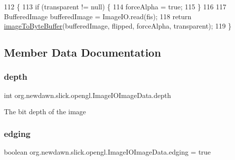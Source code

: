 \begin{DoxyCode}
112                                                                                                            
                       \{
113         \textcolor{keywordflow}{if} (transparent != null) \{
114             forceAlpha = \textcolor{keyword}{true};
115         \}
116         
117         BufferedImage bufferedImage = ImageIO.read(fis);
118         \textcolor{keywordflow}{return} \mbox{\hyperlink{classorg_1_1newdawn_1_1slick_1_1opengl_1_1_image_i_o_image_data_ac5ab7c2b917c07b09fa100784fc7b8d7}{imageToByteBuffer}}(bufferedImage, flipped, forceAlpha, transparent);
119     \}
\end{DoxyCode}


\subsection{Member Data Documentation}
\mbox{\label{classorg_1_1newdawn_1_1slick_1_1opengl_1_1_image_i_o_image_data_a9732e4c418ef7044cb5ee44f1a6e5f69}} 
\subsubsection{\texorpdfstring{depth}{depth}}
{\footnotesize\ttfamily int org.\+newdawn.\+slick.\+opengl.\+Image\+I\+O\+Image\+Data.\+depth\hspace{0.3cm}{\ttfamily [private]}}

The bit depth of the image \mbox{\label{classorg_1_1newdawn_1_1slick_1_1opengl_1_1_image_i_o_image_data_ae93f5c7af2aa1995c55cd584bf5e9735}} 
\subsubsection{\texorpdfstring{edging}{edging}}
{\footnotesize\ttfamily boolean org.\+newdawn.\+slick.\+opengl.\+Image\+I\+O\+Image\+Data.\+edging = true\hspace{0.3cm}{\ttfamily [private]}}

